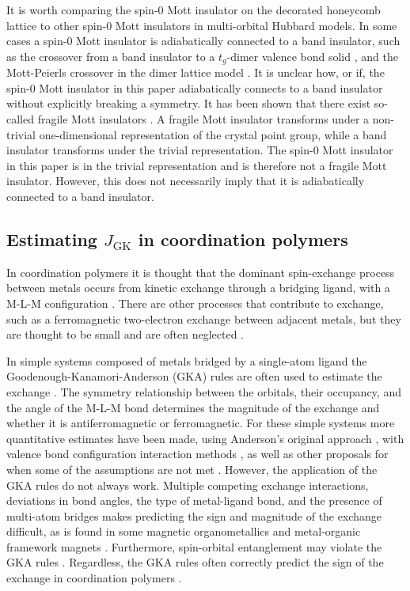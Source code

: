 \documentclass[reprint,aps,prb,amsmath,amssymb]{revtex4-2}
\begin{document}
It is worth comparing the spin-$0$ Mott insulator on the decorated honeycomb lattice to other spin-$0$ Mott insulators in multi-orbital Hubbard models. In some cases a spin-$0$ Mott insulator is adiabatically connected to a band insulator, such as the crossover from a band insulator to a $t_g$-dimer valence bond solid \cite{Nourse2021}, and the Mott-Peierls crossover in the dimer lattice model \cite{Fabrizio2007,Najera2018}. It is unclear how, or if, the spin-$0$ Mott insulator in this paper adiabatically connects to a band insulator without explicitly breaking a symmetry. It has been shown that there exist so-called fragile Mott insulators \cite{Yao2010}. A fragile Mott insulator transforms under a non-trivial one-dimensional representation of the crystal point group, while a band insulator transforms under the trivial representation. The spin-$0$ Mott insulator in this paper is in the trivial representation and is therefore not a fragile Mott insulator. However, this does not necessarily imply that it is adiabatically connected to a band insulator.

\subsection{Estimating $J_{\mathrm{GK}}$ in coordination polymers} \label{sec:gka-rules}
In coordination polymers it is thought that the dominant spin-exchange process between metals occurs from kinetic exchange through a bridging ligand, with a M-L-M configuration \cite{Thorarinsdottir2020}. There are other processes that contribute to exchange, such as a ferromagnetic two-electron exchange between adjacent metals, but they are thought to be small and are often neglected \cite{Goodenough1963,Weihe2000,Kenny2021}.

In simple systems composed of metals bridged by a single-atom ligand the Goodenough-Kanamori-Anderson (GKA) rules are often used to estimate the exchange \cite{Goodenough1955,Goodenough1958,Goodenough1963,Kanamori1959,Kanamori1963b,Anderson1959,Anderson1963}. The symmetry relationship between the orbitals, their occupancy, and the angle of the M-L-M bond determines the magnitude of the exchange and whether it is antiferromagnetic or ferromagnetic. For these simple systems more quantitative estimates have been made, using Anderson's original approach \cite{Anderson1963,Geertsma1990,Weihe1997}, with valence bond configuration interaction methods \cite{Zaanen1987,Tuczek1993,Brown1995,Weihe2000}, as well as other proposals for when some of the assumptions are not met \cite{Heuvel2007}. However, the application of the GKA rules do not always work. Multiple competing exchange interactions, deviations in bond angles, the type of metal-ligand bond, and the presence of multi-atom bridges makes predicting the sign and magnitude of the exchange difficult, as is found in some magnetic organometallics \cite{Geertsma1995,Geertsma1996} and metal-organic framework magnets \cite{Thorarinsdottir2020}. Furthermore, spin-orbital entanglement may violate the GKA rules \cite{Oleifmmode2006}. Regardless, the GKA rules often correctly predict the sign of the exchange in coordination polymers \cite{Thorarinsdottir2020}.
\end{document}
